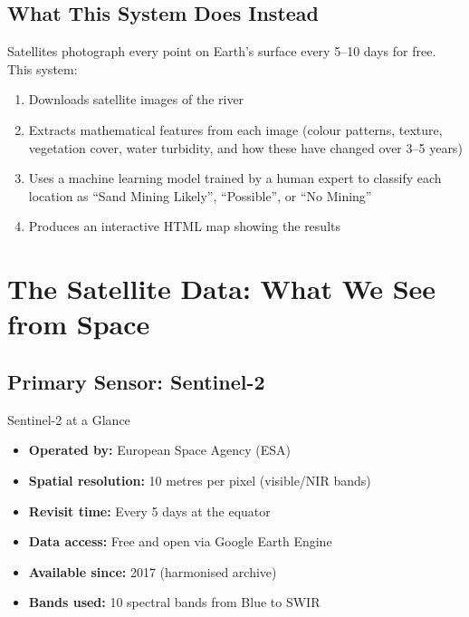 \documentclass[12pt, a4paper]{article}
\begin{document}
\subsection{What This System Does Instead}

Satellites photograph every point on Earth's surface every 5--10 days
for free. This system:

\begin{enumerate}[noitemsep]
  \item Downloads satellite images of the river
  \item Extracts mathematical features from each image (colour patterns,
        texture, vegetation cover, water turbidity, and how these have
        changed over 3--5 years)
  \item Uses a machine learning model trained by a human expert to classify
        each location as ``Sand Mining Likely'', ``Possible'', or ``No Mining''
  \item Produces an interactive HTML map showing the results
\end{enumerate}

\section{The Satellite Data: What We See from Space}

\subsection{Primary Sensor: Sentinel-2}

\begin{keybox}{Sentinel-2 at a Glance}
  \begin{itemize}[noitemsep]
    \item \textbf{Operated by:} European Space Agency (ESA)
    \item \textbf{Spatial resolution:} 10 metres per pixel (visible/NIR bands)
    \item \textbf{Revisit time:} Every 5 days at the equator
    \item \textbf{Data access:} Free and open via Google Earth Engine
    \item \textbf{Available since:} 2017 (harmonised archive)
    \item \textbf{Bands used:} 10 spectral bands from Blue to SWIR
  \end{itemize}
\end{keybox}
\end{document}
